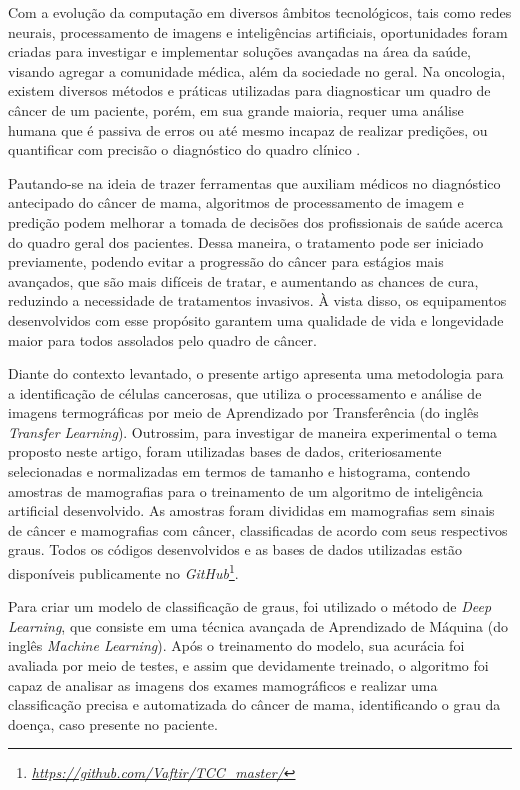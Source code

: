 Com a evolução da computação em diversos âmbitos tecnológicos, tais como redes neurais, processamento de imagens e inteligências artificiais, oportunidades foram criadas para investigar e implementar soluções avançadas na área da saúde, visando agregar a comunidade médica, além da sociedade no geral. Na oncologia, existem diversos métodos e práticas utilizadas para diagnosticar um quadro de câncer de um paciente, porém, em sua grande maioria, requer uma análise humana que é passiva de erros ou até mesmo incapaz de realizar predições, ou quantificar com precisão o diagnóstico do quadro clínico \cite{parametrization}.

Pautando-se na ideia de trazer ferramentas que auxiliam médicos no diagnóstico antecipado do câncer de mama, algoritmos de processamento de imagem e predição podem melhorar a tomada de decisões dos profissionais de saúde acerca do quadro geral dos pacientes. Dessa maneira, o tratamento pode ser iniciado previamente, podendo evitar a progressão do câncer para estágios mais avançados, que são mais difíceis de tratar, e aumentando as chances de cura, reduzindo a necessidade de tratamentos invasivos. À vista disso, os equipamentos desenvolvidos com esse propósito garantem uma qualidade de vida e longevidade maior para todos assolados pelo quadro de câncer.

Diante do contexto levantado, o presente artigo apresenta uma metodologia para a identificação de células cancerosas, que utiliza o processamento e análise de imagens termográficas por meio de Aprendizado por Transferência (do inglês \textit{Transfer Learning}). Outrossim, para investigar de maneira experimental o tema proposto neste artigo, foram utilizadas bases de dados, criteriosamente selecionadas e normalizadas em termos de tamanho e histograma, contendo amostras de mamografias para o treinamento de um algoritmo de inteligência artificial desenvolvido. As amostras foram divididas em mamografias sem sinais de câncer e mamografias com câncer, classificadas de acordo com seus respectivos graus. Todos os códigos desenvolvidos e as bases de dados utilizadas estão disponíveis publicamente no \textit{GitHub}\footnote{\href{https://github.com/Vaftir/TCC_master/}{\textit{https://github.com/Vaftir/TCC\_master/}}}.

Para criar um modelo de classificação de graus, foi utilizado o método de \textit{Deep Learning}, que consiste em uma técnica avançada de Aprendizado de Máquina (do inglês \textit{Machine Learning}). Após o treinamento do modelo, sua acurácia foi avaliada por meio de testes, e assim que devidamente treinado, o algoritmo foi capaz de analisar as imagens dos exames mamográficos e realizar uma classificação precisa e automatizada do câncer de mama, identificando o grau da doença, caso presente no paciente.

